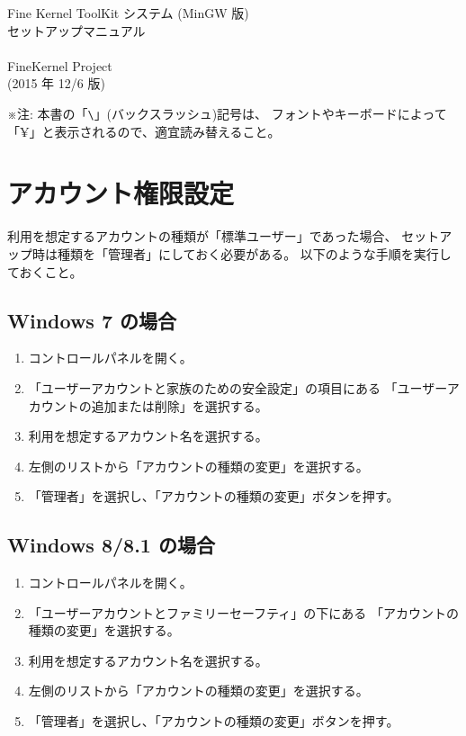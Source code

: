\documentclass[a4paper]{jsarticle}
\begin{document}
\begin{center}
{\LARGE Fine Kernel ToolKit システム (MinGW 版) \\
	セットアップマニュアル} \\ ~ \\
{\Large FineKernel Project} \\
(2015 年 12/6 版)
\end{center}

※注: 本書の「\verb+\+」(バックスラッシュ)記号は、
フォントやキーボードによって「¥」と表示されるので、適宜読み替えること。

\section{アカウント権限設定}
利用を想定するアカウントの種類が「標準ユーザー」であった場合、
セットアップ時は種類を「管理者」にしておく必要がある。
以下のような手順を実行しておくこと。
\subsection{Windows 7 の場合}
\begin{enumerate}
 \item コントロールパネルを開く。
 \item 「ユーザーアカウントと家族のための安全設定」の項目にある
	「ユーザーアカウントの追加または削除」を選択する。
 \item 利用を想定するアカウント名を選択する。
 \item 左側のリストから「アカウントの種類の変更」を選択する。
 \item 「管理者」を選択し、「アカウントの種類の変更」ボタンを押す。
\end{enumerate}

\subsection{Windows 8/8.1 の場合}
\begin{enumerate}
 \item コントロールパネルを開く。
 \item 「ユーザーアカウントとファミリーセーフティ」の下にある
	「アカウントの種類の変更」を選択する。
 \item 利用を想定するアカウント名を選択する。
 \item 左側のリストから「アカウントの種類の変更」を選択する。
 \item 「管理者」を選択し、「アカウントの種類の変更」ボタンを押す。
\end{enumerate}
\end{document}
